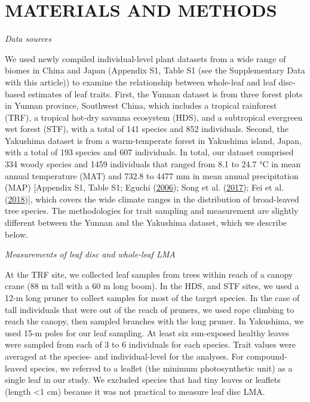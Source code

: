 \documentclass[
  12pt,
  a4paper,
,tablecaptionabove
]{scrartcl}
\begin{document}
\hypertarget{materials-and-methods}{%
\section{MATERIALS AND METHODS}\label{materials-and-methods}}

\emph{Data sources}

We used newly compiled individual-level plant datasets from a wide range of biomes in China and Japan (Appendix S1, Table S1 (see the Supplementary Data with this article)) to examine the relationship between whole-leaf and leaf disc-based estimates of leaf traits.
First, the Yunnan dataset is from three forest plots in Yunnan province, Southwest China, which includes a tropical rainforest (TRF), a tropical hot-dry savanna ecosystem (HDS), and a subtropical evergreen wet forest (STF), with a total of 141 species and 852 individuals.
Second, the Yakushima dataset is from a warm-temperate forest in Yakushima island, Japan, with a total of 193 species and 607 individuals.
In total, our dataset comprised 334 woody species and 1459 individuals that ranged from 8.1 to 24.7 °C in mean annual temperature (MAT) and 732.8 to 4477 mm in mean annual precipitation (MAP) {[}Appendix S1, Table S1; Eguchi (\protect\hyperlink{ref-Eguchi2006}{2006}); Song et al. (\protect\hyperlink{ref-Song2017}{2017}); Fei et al. (\protect\hyperlink{ref-Fei2018}{2018}){]}, which covers the wide climate ranges in the distribution of broad-leaved tree species.
The methodologies for trait sampling and measurement are slightly different between the Yunnan and the Yakushima dataset, which we describe below.

\emph{Measurements of leaf disc and whole-leaf LMA}

At the TRF site, we collected leaf samples from trees within reach of a canopy crane (88 m tall with a 60 m long boom).
In the HDS, and STF sites, we used a 12-m long pruner to collect samples for most of the target species.
In the case of tall individuals that were out of the reach of pruners, we used rope climbing to reach the canopy, then sampled branches with the long pruner.
In Yakushima, we used 15-m poles for our leaf sampling.
At least six sun-exposed healthy leaves were sampled from each of 3 to 6 individuals for each species.
Trait values were averaged at the species- and individual-level for the analyses.
For compound-leaved species, we referred to a leaflet (the minimum photosynthetic unit) as a single leaf in our study.
We excluded species that had tiny leaves or leaflets (length \textless1 cm) because it was not practical to measure leaf disc LMA.
\end{document}
